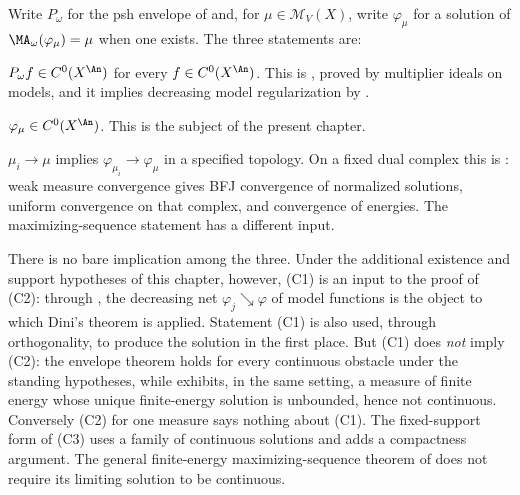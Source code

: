 Write $P_\omega$ for the psh envelope of  and, for
$\mu\in\mathcal M_V(X)$, write $\varphi_\mu$ for a solution of
$\MA_\omega(\varphi_\mu)=\mu$ when one exists.  The three statements are:

\begin{description}[style=nextline,leftmargin=1.5em,itemsep=.4\baselineskip]
\item[(C1) Continuity of envelopes.]
$P_\omega f\in C^0(X^{\An})$ for every $f\in C^0(X^{\An})$.  This is
, proved by multiplier ideals on models,
and it implies decreasing model regularization
by .
\item[(C2) Continuity of solutions.]
$\varphi_\mu\in C^0(X^{\An})$.  This is the subject of the present
chapter.
\item[(C3) Continuity of the solution map.]
$\mu_i\to\mu$ implies $\varphi_{\mu_i}\to\varphi_\mu$ in a specified
topology.  On a fixed dual complex this is
: weak measure convergence gives
BFJ convergence of normalized solutions, uniform convergence on that
complex, and convergence of energies.  The maximizing-sequence statement
 has a different input.
\end{description}

There is no bare implication among the three.  Under the additional
existence and support hypotheses of this chapter, however, (C1) is an
input to the proof of (C2): through
, the
decreasing net $\varphi_j\searrow\varphi$ of model functions is the object
to which Dini's theorem is applied.  Statement (C1) is also used, through
orthogonality, to produce the solution in the first place.  But (C1) does
\emph{not} imply (C2): the envelope theorem holds for every continuous
obstacle under the standing hypotheses, while
 exhibits, in the same setting, a
measure of finite energy whose unique finite-energy solution is unbounded,
hence not continuous.  Conversely (C2) for one measure says nothing about
(C1).  The fixed-support form of (C3) uses a family of continuous solutions
and adds a compactness argument.  The general finite-energy
maximizing-sequence theorem of 
does not require its limiting solution to be continuous.

